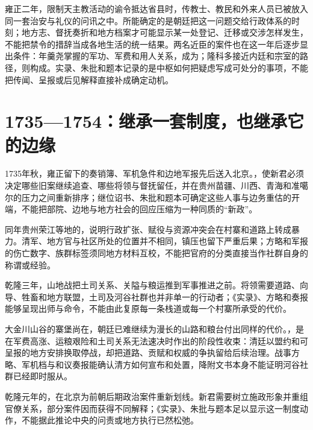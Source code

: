 雍正二年，限制天主教活动的谕令抵达省县时，传教士、教民和外来人员已被放入同一套治安与礼仪的问讯之中。所能确定的是朝廷把这一问题交给行政体系的时刻；地方志、督抚奏折和地方档案才可能显示某一处登记、迁移或交涉怎样发生，不能把禁令的措辞当成各地生活的统一结果。两名近臣的案件也在这一年后逐步显出条件：年羹尧掌握的军功、军费和用人关系，成为；隆科多接近内廷和宗室的路径，则构成。实录、朱批和题本记录的是中枢如何把疑虑写成可处分的事项，不能把传闻、呈报或后见解释直接补成确定动机。

\section{1735—1754：继承一套制度，也继承它的边缘}

1735年秋，雍正留下的奏销簿、军机急件和边地军报先后送入北京。，使新君必须决定哪些旧案继续追查、哪些将领与督抚留任，并在贵州苗疆、川西、青海和准噶尔的压力之间重新排序；继位诏书、朱批和题本可确定这些人事与边务重估的开端，不能把部院、边地与地方社会的回应压缩为一种同质的“新政”。

同年贵州荣江等地的，说明行政扩张、赋役与资源冲突会在村寨和道路上转成暴力。清军、地方官与社区所处的位置并不相同，镇压也留下严重后果；方略和军报的伤亡数字、族群标签须同地方材料互校，不能把官府的分类直接当作社群自身的称谓或经验。

乾隆三年，山地战把土司关系、关隘与粮运推到军事推进之前。将领需要道路、向导、牲畜和地方联盟，土司及河谷社群也并非单一的行动者；《实录》、方略和奏报能够呈现出师与命令，不能由此复原每一条栈道或每一个村寨所承受的代价。

大金川山谷的寨堡尚在，朝廷已难继续为漫长的山路和粮台付出同样的代价。，是在军费高涨、运粮艰险和土司关系无法速决时作出的阶段性收束：清廷以盟约和可呈报的地方安排换取停战，却把道路、贡赋和权威的争执留给后续治理。战事方略、军机档与和议奏报能确认清方如何宣布和处置，降附文书本身不能证明河谷社群已经即时服从。

乾隆元年的，在北京为前朝后期政治案件重新划线。新君需要树立施政形象并重组官僚关系，部分案件因而获得不同解释；《实录》、朱批与题本足以显示这一制度动作，不能据此推论中央的问责或地方执行已然松弛。

